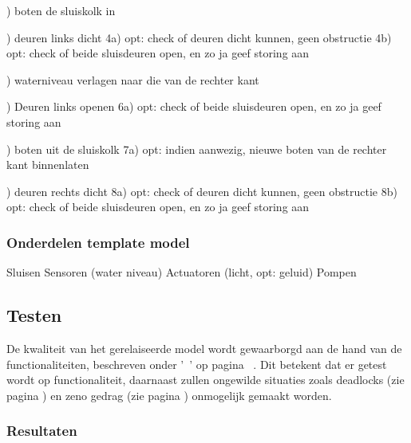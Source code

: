 \documentclass{article}
\begin{document}
) boten de sluiskolk in \newline

) deuren links dicht \newline
4a) opt: check of deuren dicht kunnen, geen obstructie \newline
4b) opt: check of beide sluisdeuren open, en zo ja geef storing aan \newline 

) waterniveau verlagen naar die van de rechter kant \newline

) Deuren links openen \newline
6a) opt: check of beide sluisdeuren open, en zo ja geef storing aan \newline 

) boten uit de sluiskolk \newline
7a) opt: indien aanwezig, nieuwe boten van de rechter kant binnenlaten \newline

) deuren rechts dicht \newline
8a) opt: check of deuren dicht kunnen, geen obstructie \newline
8b) opt: check of beide sluisdeuren open, en zo ja geef storing aan \newline

\subsubsection{Onderdelen template model}
Sluisen \newline
Sensoren (water niveau) \newline
Actuatoren (licht, opt: geluid) \newline
Pompen


\subsection{Testen}

De kwaliteit van het gerelaiseerde model wordt gewaarborgd aan de hand van de functionaliteiten, beschreven onder '~' op pagina ~\pageref{sec:FuncList}. Dit betekent dat er getest wordt op functionaliteit, daarnaast zullen ongewilde situaties zoals deadlocks (zie pagina \pageref{deadlock}) en zeno gedrag (zie pagina \pageref{zenobehavior}) onmogelijk gemaakt worden.

\subsubsection{Resultaten}
\end{document}
